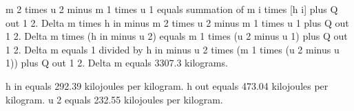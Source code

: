 m 2 times u 2 minus m 1 times u 1 equals summation of m i times [h i] plus Q out 1 2.  
Delta m times h in minus m 2 times u 2 minus m 1 times u 1 plus Q out 1 2.  
Delta m times (h in minus u 2) equals m 1 times (u 2 minus u 1) plus Q out 1 2.  
Delta m equals 1 divided by h in minus u 2 times (m 1 times (u 2 minus u 1)) plus Q out 1 2.  
Delta m equals 3307.3 kilograms.  

h in equals 292.39 kilojoules per kilogram.  
h out equals 473.04 kilojoules per kilogram.  
u 2 equals 232.55 kilojoules per kilogram.